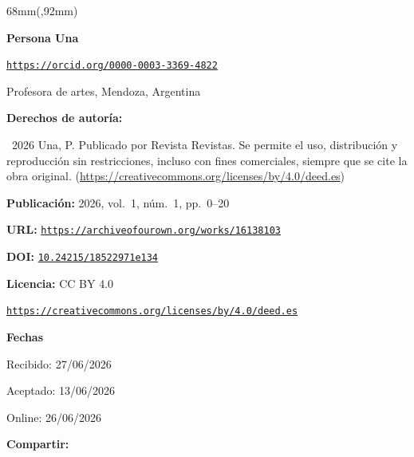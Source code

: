 \begin{textblock*}{68mm}(\gbbloquex,92mm)
{\setlength{\leftskip}{0pt}\setlength{\parindent}{0pt}%
\noindent\begin{minipage}[t]{68mm}
\sffamily\small\setlength{\parskip}{1pt}
{\bfseries\color{azulrevista}Persona Una}\par
{\scriptsize\texttt{\href{https://orcid.org/0000-0003-3369-4822}{https://orcid.org/0000-0003-3369-4822}}}\par
Profesora de artes, Mendoza, Argentina\par
\vspace{6pt}
{\bfseries\color{azulrevista!70}Derechos de autor\'ia:}\par
\textcopyright\ 2026 Una, P. Publicado por Revista Revistas. Se permite el uso, distribución y reproducción sin restricciones, incluso con fines comerciales, siempre que se cite la obra original. (\href{https://creativecommons.org/licenses/by/4.0/deed.es}{https://creativecommons.org/licenses/by/4.0/deed.es})\par\vspace{6pt}
{\bfseries\color{azulrevista!70}Publicación:} 2026, vol.~1, n\'um.~1, pp.~0--20\par\vspace{6pt}
{\bfseries\color{azulrevista!70}URL:} {\scriptsize\texttt{\href{https://archiveofourown.org/works/16138103}{https://archiveofourown.org/works/16138103}}}\par\vspace{6pt}
{\bfseries\color{azulrevista!70}DOI:} {\scriptsize\texttt{\href{https://doi.org/10.24215/18522971e134}{10.24215/18522971e134}}}\par\vspace{6pt}
{\bfseries\color{azulrevista!70}Licencia:} CC BY 4.0\par
{\scriptsize\texttt{\href{https://creativecommons.org/licenses/by/4.0/deed.es}{https://creativecommons.org/licenses/by/4.0/deed.es}}}\par
\vspace{6pt}
{\bfseries\color{azulrevista!70}Fechas}\par\vspace{2pt}
Recibido: 27/06/2026\par
Aceptado: 13/06/2026\par
Online: 26/06/2026\par
\vspace{6pt}
\vspace{6pt}
{\bfseries\color{azulrevista!70}Compartir:}\par\vspace{3pt}

\end{minipage}}
\end{textblock*}
